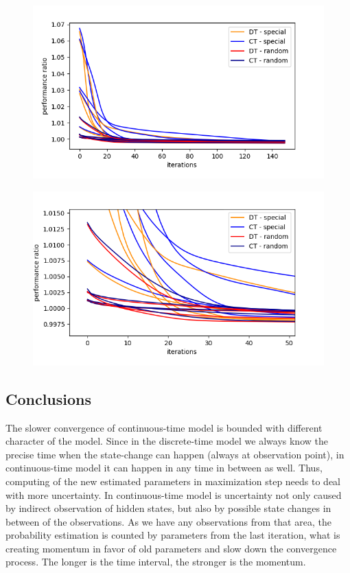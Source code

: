\documentclass[thesis=M,english]{FITthesis}[2012/10/20]
\begin{document}
\begin{figure}
\centering
\begin{minipage}{.8\textwidth}
  \centering
  \includegraphics[width=1\linewidth]{img/ex1/g3.png}
  \label{fig:all}
\end{minipage}
\begin{minipage}{.8\textwidth}
  \centering
  \includegraphics[width=.95\linewidth]{img/ex1/g4.png}
  \label{fig:random}
\end{minipage}
\end{figure}  

\subsection*{ Conclusions }

The slower convergence of continuous-time model is bounded with different character of the model. Since in the discrete-time model we always know the precise time when the state-change can happen (always at observation point), in continuous-time model it can happen in any time in between as well. Thus, computing of the new estimated parameters in maximization step needs to deal with more uncertainty. 
In continuous-time model is uncertainty not only caused by indirect observation of hidden states, but also by possible state changes in between of the observations. As we have any observations from that area, the probability estimation is counted by parameters from the last iteration, what is creating momentum in favor of old parameters and slow down the convergence process. The longer is the time interval, the stronger is the momentum.
\end{document}
